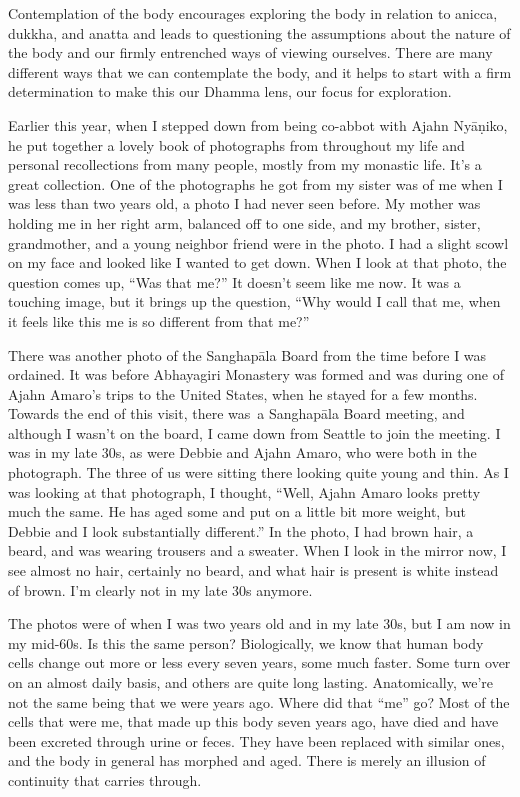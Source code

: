 Contemplation of the body encourages exploring the body in relation to anicca, dukkha, and anatta and leads to questioning the assumptions about the nature of the body and our firmly entrenched ways of viewing ourselves. There are many different ways that we can contemplate the body, and it helps to start with a firm determination to make this our Dhamma lens, our focus for exploration.

Earlier this year, when I stepped down from being co-abbot with Ajahn Nyāṇiko, he put together a lovely book of photographs from throughout my life and personal recollections from many people, mostly from my monastic life. It's a great collection. One of the photographs he got from my sister was of me when I was less than two years old, a photo I had never seen before. My mother was holding me in her right arm, balanced off to one side, and my brother, sister, grandmother, and a young neighbor friend were in the photo. I had a slight scowl on my face and looked like I wanted to get down. When I look at that photo, the question comes up, ``Was that me?'' It doesn't seem like me now. It was a touching image, but it brings up the question, ``Why would I call that me, when it feels like this me is so different from that me?''

There was another photo of the Sanghapāla Board from the time before I was ordained. It was before Abhayagiri Monastery was formed and was during one of Ajahn Amaro's trips to the United States, when he stayed for a few months. Towards the end of this visit, there \mbox{was a} Sanghapāla Board meeting, and although I wasn't on the board, I came down from Seattle to join the meeting. I was in my late 30s, as were Debbie and Ajahn Amaro, who were both in the photograph. The three of us were sitting there looking quite young and thin. As I was looking at that photograph, I thought, ``Well, Ajahn Amaro looks pretty much the same. He has aged some and put on a little bit more weight, but Debbie and I look substantially different.'' In the photo, I had brown hair, a beard, and was wearing trousers and a sweater. When I look in the mirror now, I see almost no hair, certainly no beard, and what hair is present is white instead of brown. I'm clearly not in my late 30s anymore.

The photos were of when I was two years old and in my late 30s, but I am now in my mid-60s. Is this the same person? Biologically, we know that human body cells change out more or less every seven years, some much faster. Some turn over on an almost daily basis, and others are quite long lasting. Anatomically, we're not the same being that we were years ago. Where did that ``me'' go? Most of the cells that were me, that made up this body seven years ago, have died and have been excreted through urine or feces. They have been replaced with similar ones, and the body in general has morphed and aged. There is merely an illusion of continuity that carries through.

